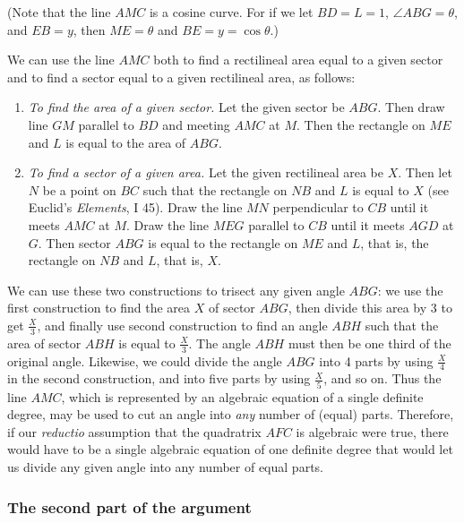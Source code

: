 \documentclass[polutonikogreek,english,twoside,openright]{article}
\begin{document}
\label{begca}
(Note that the line $AMC$ is a cosine curve.  For if we let
$BD = L = 1$, $\angle ABG = \theta$, and $EB = y$, then $ME = \theta$
and $BE = y = \cos \theta.$)

We can use the line $AMC$ both to find a rectilineal area equal to a
given sector and to find a sector equal to a given rectilineal area,
as follows:
\begin{enumerate}
\item {\em To find the area of a given sector.}  Let the given sector
  be $ABG$.  Then draw line $GM$ parallel to $BD$ and meeting $AMC$ at
  $M$.  Then the rectangle on $ME$ and $L$ is equal to the area of
  $ABG$.
\item {\em To find a sector of a given area.}  Let the given
  rectilineal area be $X$.  Then let $N$ be a point on $BC$ such that
  the rectangle on $NB$ and $L$ is equal to $X$ (see Euclid's {\em
    Elements}, I 45).  Draw the line $MN$ perpendicular to $CB$ until
  it meets $AMC$ at $M$.  Draw the line $MEG$ parallel to $CB$ until
  it meets $AGD$ at $G$.  Then sector $ABG$ is equal to the rectangle
  on $ME$ and $L$, that is, the rectangle on $NB$ and $L$, that is,
  $X$.
\end{enumerate}
We can use these two constructions to trisect any given angle $ABG$:
we use the first construction to find the area $X$ of sector $ABG$,
then divide this area by 3 to get $\frac{X}{3}$, and finally use
second construction to find an angle $ABH$ such that the area of
sector $ABH$ is equal to $\frac{X}{3}$.  The angle $ABH$ must then be
one third of the original angle.  Likewise, we could divide the angle
$ABG$ into 4 parts by using $\frac{X}{4}$ in the second construction,
and into five parts by using $\frac{X}{5}$, and so on.  Thus the line
$AMC$, which is represented by an algebraic equation of a single
definite degree, may be used to cut an angle into {\em any} number of
(equal) parts.  Therefore, if our {\em reductio} assumption that the
quadratrix $AFC$ is algebraic were true, there would have to be a
single algebraic equation of one definite degree that would let us
divide any given angle into any number of equal parts.
\label{endca}

\subsubsection*{The second part of the argument}
\end{document}
